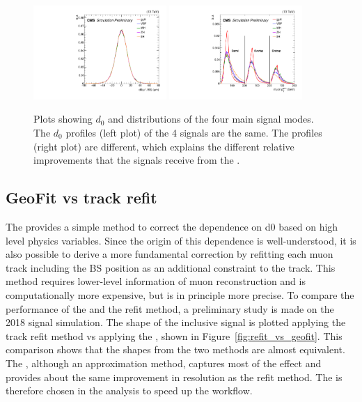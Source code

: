 \begin{figure}[!htb]
      \centering
      \captionsetup{justification=justified}
      \includegraphics[width=0.45\textwidth]{pics/muon_corr/GeoFit/performance/samp_d0.pdf}
      \includegraphics[width=0.45\textwidth]{pics/muon_corr/GeoFit/performance/samp_pt_BOE.pdf}
      \caption{Plots showing $d_0$ and \pt distributions of the four main \hmm signal modes. 
               The $d_0$ profiles (left plot) of the 4 signals are the same.
               The \pt profiles (right plot) are different, which explains the different relative improvements  
               that the signals receive from the \GeoFit.
               }
      \label{fig:sigs_d0_pt}
\end{figure}



\subsection{GeoFit vs track refit}\label{sec:track_refit}

The \GeoFit provides a simple method to correct the \pt dependence on d0 based on high level physics variables.
Since the origin of this \pt dependence is well-understood, it is also possible to derive a more fundamental correction
by refitting each muon track including the BS position as an additional constraint to the track.
This method requires lower-level information of muon reconstruction and is computationally more expensive,
but is in principle more precise.
To compare the performance of the \GeoFit and the refit method, a preliminary study is made on the 2018 \ggH signal simulation.
The \mmm shape of the inclusive signal is plotted applying the track refit method vs applying the \GeoFit, shown in Figure~\ref{fig:refit_vs_geofit}.
This comparison shows that the \mmm shapes from the two methods are almost equivalent.
The \GeoFit, although an approximation method, captures most of the effect and provides about the same improvement in \mmm resolution as the refit method.
The \GeoFit is therefore chosen in the \hmm analysis to speed up the workflow.

